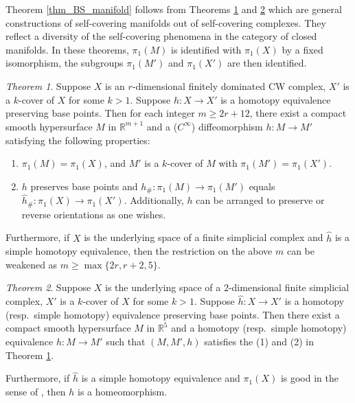 \documentclass[12pt]{amsart}
\theoremstyle{plain}
\theoremstyle{definition}
\theoremstyle{question}
\theoremstyle{remark}
\theoremstyle{assumption}
\numberwithin{equation}{section}
\theoremstyle{bigthm}
\newtheorem{bigthm}{Theorem}
\begin{document}
Theorem \ref{thm_BS_manifold} follows from Theorems \ref{thm_cw_manifold} and \ref{thm_cw_4-manifold} which are general constructions of self-covering manifolds out of self-covering complexes. They reflect a diversity of the self-covering phenomena in the category of closed manifolds. In these theorems, $\pi_{1} (M)$ is identified with $\pi_{1} (X)$ by a fixed isomorphism, the subgroups $\pi_{1} (M')$ and $\pi_{1} (X')$ are then identified.

\begin{bigthm}\label{thm_cw_manifold}
Suppose $X$ is an $r$-dimensional finitely dominated CW complex, $X'$ is a $k$-cover of $X$ for some $k>1$. Suppose $\hat{h} \colon  X \rightarrow X'$ is a homotopy equivalence preserving base points. Then for each integer $m \ge 2r+12$, there exist a compact smooth hypersurface $M$ in $\mathbb{R}^{m+1}$ and a ($C^{\infty}$) diffeomorphism $h \colon  M \rightarrow M'$ satisfying the following properties:
\begin{enumerate}
\item $\pi_{1} (M) = \pi_{1} (X)$, and $M'$ is a $k$-cover of $M$ with $\pi_{1} (M') = \pi_{1} (X')$.

\item $h$ preserves base points and $h_{\#} \colon  \pi_{1} (M) \rightarrow \pi_{1} (M')$ equals $\hat{h}_{\#} \colon  \pi_{1} (X) \rightarrow \pi_{1} (X')$. Additionally, $h$ can be arranged to preserve or reverse orientations as one wishes.
\end{enumerate}

Furthermore, if $X$ is the underlying space of a finite simplicial complex and $\hat{h}$ is a simple homotopy equivalence, then the restriction on the above $m$ can be weakened as $m \ge \max \{ 2r, r+2, 5 \}$.
\end{bigthm}

\begin{bigthm}\label{thm_cw_4-manifold}
Suppose $X$ is the underlying space of a $2$-dimensional finite simplicial complex, $X'$ is a $k$-cover of $X$ for some $k>1$. Suppose $\hat{h} \colon  X \rightarrow X'$ is a homotopy (resp.~simple homotopy) equivalence preserving base points. Then there exist a compact smooth hypersurface $M$ in $\mathbb{R}^{5}$ and a homotopy (resp.~simple homotopy) equivalence $h \colon  M \rightarrow M'$ such that $(M,M',h)$ satisfies the (1) and (2) in Theorem \ref{thm_cw_manifold}.

Furthermore, if $\hat{h}$ is a simple homotopy equivalence and $\pi_{1} (X)$ is good in the sense of \cite{Freedman_Teichner}, then $h$ is a homeomorphism.
\end{bigthm}
\end{document}
